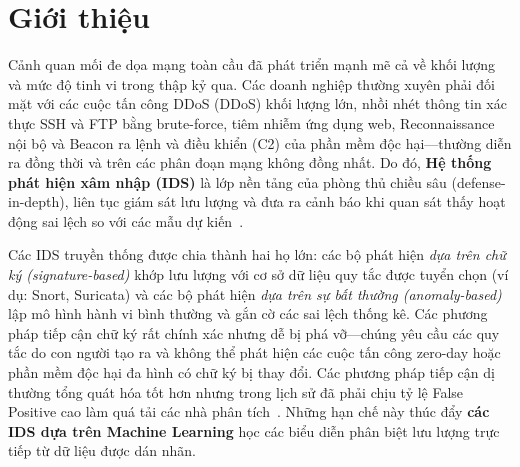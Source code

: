 \section{Giới thiệu}
\label{sec:intro}

Cảnh quan mối đe dọa mạng toàn cầu đã phát triển mạnh mẽ cả về khối lượng và mức độ tinh vi trong thập kỷ qua. Các doanh nghiệp thường xuyên phải đối mặt với các cuộc tấn công DDoS (DDoS) khối lượng lớn, nhồi nhét thông tin xác thực SSH và FTP bằng brute-force, tiêm nhiễm ứng dụng web, Reconnaissance nội bộ và Beacon ra lệnh và điều khiển (C2) của phần mềm độc hại---thường diễn ra đồng thời và trên các phân đoạn mạng không đồng nhất. Do đó, \textbf{Hệ thống phát hiện xâm nhập (IDS)} là lớp nền tảng của phòng thủ chiều sâu (defense-in-depth), liên tục giám sát lưu lượng và đưa ra cảnh báo khi quan sát thấy hoạt động sai lệch so với các mẫu dự kiến~\cite{ref_anomaly_survey}.

Các IDS truyền thống được chia thành hai họ lớn: các bộ phát hiện \emph{dựa trên chữ ký (signature-based)} khớp lưu lượng với cơ sở dữ liệu quy tắc được tuyển chọn (ví dụ: Snort, Suricata) và các bộ phát hiện \emph{dựa trên sự bất thường (anomaly-based)} lập mô hình hành vi bình thường và gắn cờ các sai lệch thống kê. Các phương pháp tiếp cận chữ ký rất chính xác nhưng dễ bị phá vỡ---chúng yêu cầu các quy tắc do con người tạo ra và không thể phát hiện các cuộc tấn công zero-day hoặc phần mềm độc hại đa hình có chữ ký bị thay đổi. Các phương pháp tiếp cận dị thường tổng quát hóa tốt hơn nhưng trong lịch sử đã phải chịu tỷ lệ False Positive cao làm quá tải các nhà phân tích~\cite{ref_dl_ids}. Những hạn chế này thúc đẩy \textbf{các IDS dựa trên Machine Learning} học các biểu diễn phân biệt lưu lượng trực tiếp từ dữ liệu được dán nhãn.

